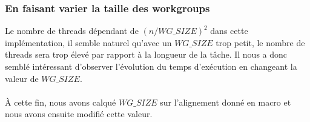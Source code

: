 \documentclass{article}
\begin{document}
\subsubsection{En faisant varier la taille des workgroups}
Le nombre de threads dépendant de $(n/ WG\_SIZE)^2$ dans cette implémentation,
il semble naturel qu'avec un $WG\_SIZE$ trop petit, le nombre de threads sera
trop élevé par rapport à la longueur de la tâche. Il nous a donc semblé
intéressant d'observer l'évolution du temps d'exécution en changeant la valeur
de $WG\_SIZE$.
\paragraph{}
À cette fin, nous avons calqué $WG\_SIZE$ sur l'alignement donné en macro et
nous avons ensuite modifié cette valeur.
\end{document}
